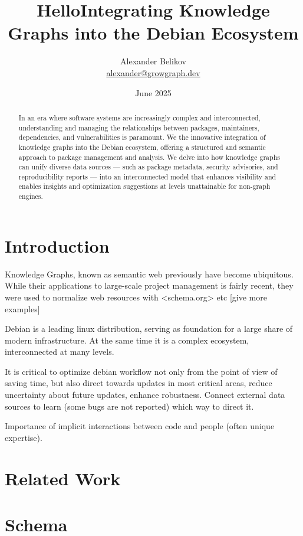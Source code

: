 \documentclass[11pt,oneside,a4paper]{article}
\title{Hello}
\title{Integrating Knowledge Graphs into the Debian Ecosystem}
\author{Alexander Belikov \\ \href{mailto:alexander@growgraph.dev}{alexander@growgraph.dev}}
\date{June 2025}
\begin{document}
    \maketitle

    \begin{abstract}
        In an era where software systems are increasingly complex and interconnected, understanding and managing the relationships between packages, maintainers, dependencies, and vulnerabilities is paramount.
        We the innovative integration of knowledge graphs into the Debian ecosystem, offering a structured and semantic approach to package management and analysis.
        We delve into how knowledge graphs can unify diverse data sources — such as package metadata, security advisories, and reproducibility reports — into an interconnected model that enhances visibility and enables insights and optimization suggestions at levels unattainable for non-graph engines.
    \end{abstract}


    \section{Introduction}

    Knowledge Graphs, known as semantic web previously have become ubiquitous.
    While their applications to large-scale project management is fairly recent, they were used to normalize web resources with <schema.org> \cite{Iliadis2023-cm} etc [give more examples]



    Debian is a leading linux distribution, serving as foundation for a large share of modern infrastructure.
    At the same time it is a complex ecosystem, interconnected at many levels.

    It is critical to optimize debian workflow not only from the point of view of saving time, but also direct towards updates in most critical areas, reduce uncertainty about future updates, enhance robustness.
    Connect external data sources to learn (some bugs are not reported) which way to direct it.


    Importance of implicit interactions between code and people (often unique expertise).


    \section{Related Work}


    \section{Schema}
\end{document}
